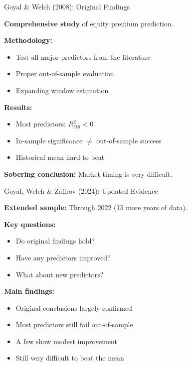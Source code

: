 \documentclass[10pt]{beamer}
\newcommand{\highlight}[1]{\textcolor{AccentOrange}{\textbf{#1}}}
\begin{document}

\begin{frame}{Goyal \& Welch (2008): Original Findings}

\textbf{Comprehensive study} of equity premium prediction.

\vspace{1em}
\textbf{Methodology:}
\begin{itemize}
  \item Test all major predictors from the literature
  \item Proper out-of-sample evaluation
  \item Expanding window estimation
\end{itemize}

\vspace{1em}
\textbf{Results:}
\begin{itemize}
  \item Most predictors: $R^2_{OS} < 0$
  \item In-sample significance $\neq$ out-of-sample success
  \item Historical mean hard to beat
\end{itemize}

\vspace{1em}
\highlight{Sobering conclusion:} Market timing is very difficult.

\end{frame}


\begin{frame}{Goyal, Welch \& Zafirov (2024): Updated Evidence}

\textbf{Extended sample:} Through 2022 (15 more years of data).

\vspace{1em}
\textbf{Key questions:}
\begin{itemize}
  \item Do original findings hold?
  \item Have any predictors improved?
  \item What about new predictors?
\end{itemize}

\vspace{1em}
\textbf{Main findings:}
\begin{itemize}
  \item Original conclusions largely confirmed
  \item Most predictors still fail out-of-sample
  \item A few show modest improvement
  \item Still very difficult to beat the mean
\end{itemize}

\end{frame}
\end{document}
